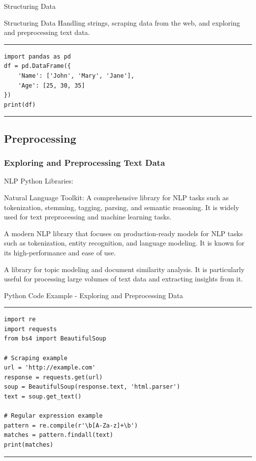\documentclass[aspectratio=169, hideothersubsections]{beamer}
\begin{document}
\begin{frame}[fragile]{Structuring Data}
\begin{block}{Structuring Data}
    Handling strings, scraping data from the web, and exploring and preprocessing text data.
\end{block}
\rule{\textwidth}{1pt}
\scriptsize
\begin{verbatim}
import pandas as pd
df = pd.DataFrame({
    'Name': ['John', 'Mary', 'Jane'],
    'Age': [25, 30, 35]
})
print(df)
\end{verbatim}
\rule{\textwidth}{1pt}
\end{frame}

\subsection{Preprocessing}
\begin{frame}
\frametitle{Exploring and Preprocessing Text Data}
NLP Python Libraries:
\begin{description}
    \item[NLTK] Natural Language Toolkit: A comprehensive library for NLP tasks such as tokenization, stemming, tagging, parsing, and semantic reasoning. It is widely used for text preprocessing and machine learning tasks.
    \item[spaCy] A modern NLP library that focuses on production-ready models for NLP tasks such as tokenization, entity recognition, and language modeling. It is known for its high-performance and ease of use.
    \item[Gensim] A library for topic modeling and document similarity analysis. It is particularly useful for processing large volumes of text data and extracting insights from it. 
\end{description}
\end{frame}


\begin{frame}[fragile]{Python Code Example - Exploring and Preprocessing Data}
\rule{\textwidth}{1pt}
\scriptsize
\begin{verbatim}
import re
import requests
from bs4 import BeautifulSoup

# Scraping example
url = 'http://example.com'
response = requests.get(url)
soup = BeautifulSoup(response.text, 'html.parser')
text = soup.get_text()

# Regular expression example
pattern = re.compile(r'\b[A-Za-z]+\b')
matches = pattern.findall(text)
print(matches)
\end{verbatim}
\rule{\textwidth}{1pt}
\end{frame}
\end{document}
